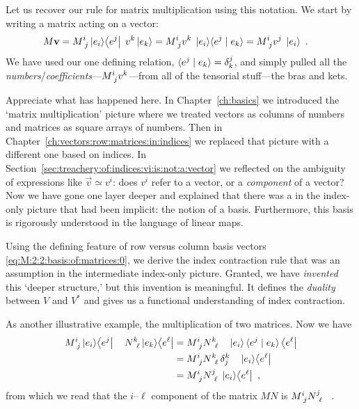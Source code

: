 Let us recover our rule for matrix multiplication using this notation. We start by writing a matrix acting on a vector:
\begin{align}
    M\vec{v} &= 
    M\aij{i}{j}\ket{e_i}\!\bra{e^j}\; 
    v^k\ket{e_k}
    =
    M\aij{i}{j} 
    v^k\; 
    \ket{e_i}\!\la{e^j} \mid {e_k} \ra
    =
    M\aij{i}{j} 
    v^j\; \ket{e_i} \ .
\end{align}
We have used our one defining relation, $\langle{e^j} \mid {e_k} \rangle = \delta^j_k$, and simply pulled all the \emph{numbers}/\emph{coefficients}---$M\aij{i}{j} v^k$---from all of the tensorial stuff---the bras and kets. 

\begin{bigidea}
Appreciate what has happened here. In Chapter~\ref{ch:basics} we introduced the `matrix multiplication' picture where we treated vectors as columns of numbers and matrices as square arrays of numbers. Then in Chapter~\ref{ch:vectors:row:matrices:in:indices} we replaced that picture with a different one based on indices. In Section~\ref{sec:treachery:of:indices:vi:is:not:a:vector} we reflected on the ambiguity of expressions like $\vec{v}\simeq v^i$: does $v^i$ refer to a vector, or a \emph{component} of a vector? Now we have gone one layer deeper and explained that there was a in the index-only picture that had been implicit: the notion of a basis. Furthermore, this basis is rigorously understood in the language of linear maps. 

Using the defining feature of row versus column basis vectors \eqref{eq:M:2:2:basis:of:matrices:0}, we derive the index contraction rule that was an assumption in the intermediate index-only picture. Granted, we have \emph{invented} this `deeper structure,' but this invention is meaningful. It defines the \emph{duality} between $V$ and $V^*$ and gives us a functional understanding of index contraction.
\end{bigidea}

As another illustrative example, the multiplication of two matrices. Now we have
\begin{align}
    M\aij{i}{j} \ket{e_i}\! \bra{e^j} \quad N\aij{k}{\ell}  \ket{e_k}\!\bra{e^\ell}
    &=
    M\aij{i}{j} N\aij{k}{\ell} \quad \ket{e_i} \la{e^j} \mid {e_k}\ra \bra{e^\ell}
    \label{eq:basis:matrix:mult:MN}
    \\&=
    M\aij{i}{j} N\aij{k}{\ell}\, \delta^k_j \quad \ket{e_i}\!\bra{e^\ell} 
    \\&=
    M\aij{i}{j} N\aij{j}{\ell} \; \ket{e_i}\!\bra{e^\ell} \ ,
\end{align}
from which we read that the $i$--$\ell$ component of the matrix $MN$ is $ M\aij{i}{j} N\aij{j}{\ell}$ \ .

